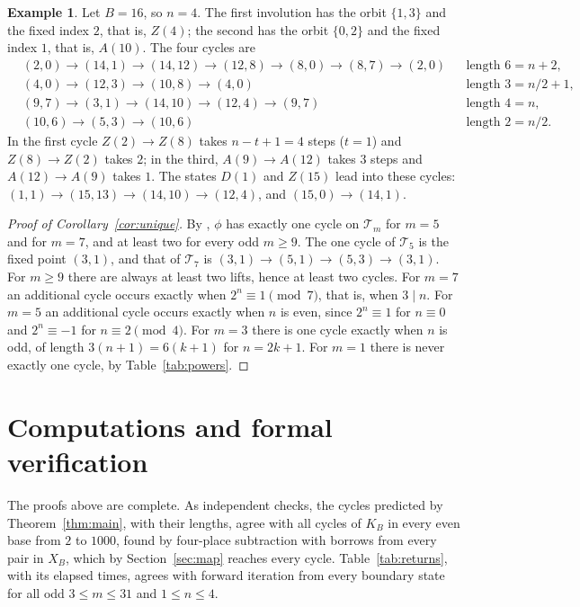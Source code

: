 \documentclass[11pt]{amsart}
\theoremstyle{definition}
\newtheorem*{example}{Example}
\theoremstyle{remark}
\newcommand{\T}{\mathcal{T}}
\begin{document}
\begin{example}
Let $B=16$, so $n=4$. The first involution has the orbit $\{1,3\}$ and the fixed index $2$, that is, $Z(4)$; the second has the orbit $\{0,2\}$ and the fixed index $1$, that is, $A(10)$. The four cycles are
\begin{align*}
&(2,0)\to(14,1)\to(14,12)\to(12,8)\to(8,0)\to(8,7)\to(2,0) &&\text{length }6=n+2,\\
&(4,0)\to(12,3)\to(10,8)\to(4,0) &&\text{length }3=n/2+1,\\
&(9,7)\to(3,1)\to(14,10)\to(12,4)\to(9,7) &&\text{length }4=n,\\
&(10,6)\to(5,3)\to(10,6) &&\text{length }2=n/2.
\end{align*}
In the first cycle $Z(2)\to Z(8)$ takes $n-t+1=4$ steps ($t=1$) and $Z(8)\to Z(2)$ takes $2$; in the third, $A(9)\to A(12)$ takes $3$ steps and $A(12)\to A(9)$ takes $1$. The states $D(1)$ and $Z(15)$ lead into these cycles: $(1,1)\to(15,13)\to(14,10)\to(12,4)$, and $(15,0)\to(14,1)$.
\end{example}

\begin{proof}[Proof of Corollary~\ref{cor:unique}]
By \cite[Corollary~27]{COST}, $\phi$ has exactly one cycle on $\T_m$ for $m=5$ and for $m=7$, and at least two for every odd $m\ge9$. The one cycle of $\T_5$ is the fixed point $(3,1)$, and that of $\T_7$ is $(3,1)\to(5,1)\to(5,3)\to(3,1)$. For $m\ge9$ there are always at least two lifts, hence at least two cycles. For $m=7$ an additional cycle occurs exactly when $2^n\equiv1\pmod7$, that is, when $3\mid n$. For $m=5$ an additional cycle occurs exactly when $n$ is even, since $2^n\equiv1$ for $n\equiv0$ and $2^n\equiv-1$ for $n\equiv2\pmod4$. For $m=3$ there is one cycle exactly when $n$ is odd, of length $3(n+1)=6(k+1)$ for $n=2k+1$. For $m=1$ there is never exactly one cycle, by Table~\ref{tab:powers}.
\end{proof}

\section{Computations and formal verification}\label{sec:verification}

The proofs above are complete. As independent checks, the cycles predicted by Theorem~\ref{thm:main}, with their lengths, agree with all cycles of $K_B$ in every even base from $2$ to $1000$, found by four-place subtraction with borrows from every pair in $X_B$, which by Section~\ref{sec:map} reaches every cycle. Table~\ref{tab:returns}, with its elapsed times, agrees with forward iteration from every boundary state for all odd $3\le m\le31$ and $1\le n\le4$.
\end{document}
